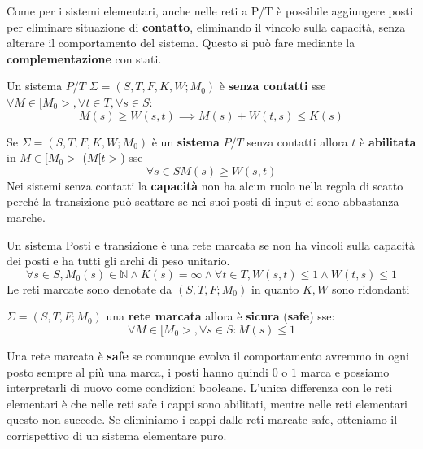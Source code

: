 Come per i sistemi elementari, anche nelle reti a P/T è possibile aggiungere posti
per eliminare situazione di \textbf{contatto}, eliminando il vincolo sulla capacità,
senza alterare il comportamento del sistema. Questo si può fare mediante la
\textbf{complementazione} con stati.
\begin{definizione}
    Un sistema $P/T$ $\Sigma = (S,T,F,K,W;M_0)$ è \textbf{senza contatti} sse
    $\forall M\in [M_0>,\forall t\in T, \forall s\in S$:
    \begin{equation}
        M(s)\ge W(s,t)\implies M(s)+W(t,s)\le K(s)
    \end{equation}
\end{definizione}
Se $\Sigma = (S,T,F,K,W;M_0)$ è un \textbf{sistema} $P/T$ senza contatti allora
$t$ è \textbf{abilitata} in $M\in [M_0>$ ($M[t>$) sse
\begin{equation}
    \forall s\in S M(s)\ge W(s,t)
\end{equation}
Nei sistemi senza contatti la \textbf{capacità} non ha alcun ruolo nella regola
di scatto perché la transizione può scattare se nei suoi posti di input ci sono
abbastanza marche.
\begin{definizione}
    Un sistema Posti e transizione è una rete marcata se non ha vincoli sulla
    capacità dei posti e ha tutti gli archi di peso unitario.
    \begin{equation}
        \forall s\in S, M_0(s)\in \mathbb{N}\land K(s)=\infty \land \forall t\in
        T, W(s,t)\le 1\land W(t,s)\le 1
    \end{equation}
    Le reti marcate sono denotate da $(S,T,F;M_0)$ in quanto $K,W$ sono ridondanti
\end{definizione}

\begin{definizione} 
    $\Sigma = (S,T,F;M_0)$ una \textbf{rete marcata} allora è \textbf{sicura}
    (\textbf{safe}) sse:
    \begin{equation}
        \forall M\in [M_0>,\forall s\in S:M(s)\le1
    \end{equation}
\end{definizione}
Una rete marcata è \textbf{safe} se comunque evolva il comportamento avremmo in
ogni posto sempre al più una marca, i posti hanno quindi $0$ o $1$ marca e possiamo
interpretarli di nuovo come condizioni booleane. L'unica differenza con le reti
elementari è che nelle reti safe i cappi sono abilitati, mentre nelle reti
elementari questo non succede. Se eliminiamo i cappi dalle reti marcate safe,
otteniamo il corrispettivo di un sistema elementare puro.

